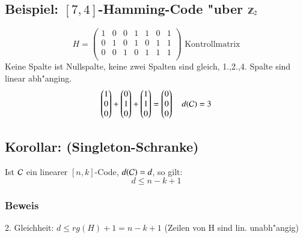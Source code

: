\subsection{Beispiel: $[7,4]$-Hamming-Code "uber $\Z_2$}
\[
	H =
	\begin{pmatrix}
		1 & 0 & 0 & 1 & 1 & 0 & 1 \\
		0 & 1 & 0 & 1 & 0 & 1 & 1 \\
		0 & 0 & 1 & 0 & 1 & 1 & 1 \\
	\end{pmatrix} \text{ Kontrollmatrix}
\]
Keine Spalte ist Nullspalte, keine zwei Spalten sind  gleich, 1.,2.,4. Spalte sind linear abh"anging.
\[
	\begin{pmatrix}
		1\\	0\\	0\\
	\end{pmatrix} +
	\begin{pmatrix}
		0\\	1\\	0\\
	\end{pmatrix} +
	\begin{pmatrix}
		1\\	1\\	0\\
	\end{pmatrix} =
	\begin{pmatrix}
		0\\	0\\	0\\
	\end{pmatrix} \quad d(\mathcal{C})=3
\]
\subsection{Korollar: (Singleton-Schranke)}
Ist $\mathcal{C}$ ein linearer $[n,k]$-Code, $d(\mathcal{C})=d$, so gilt:
\[
	d \leq n-k + 1
\]
\subsubsection{Beweis}
2. Gleichheit: $d \leq rg(H)+1=n-k+1$ (Zeilen von H sind lin. unabh"angig)
